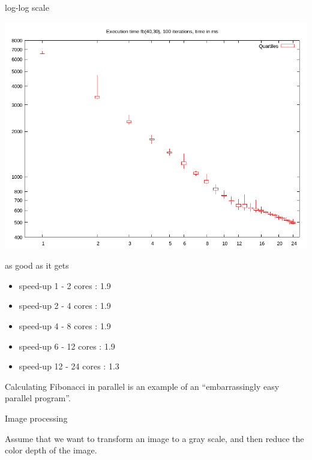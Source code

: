\begin{frame}{log-log scale}
 
\includegraphics[width=0.6\linewidth]{logxy.png}

\end{frame}

\begin{frame}{as good as it gets}

\begin{itemize}
  \item speed-up 1 - 2 cores : 1.9 %
  \item speed-up 2 - 4 cores : 1.9 %
  \item speed-up 4 - 8 cores : 1.9 %
  \item speed-up 6 - 12 cores : 1.9 %
\pause
  \item speed-up 12 - 24 cores : 1.3 %
\end{itemize}

\pause\vspace{20pt}

Calculating Fibonacci in parallel is an example of an ``embarrassingly
easy parallel program''.

\end{frame}

\begin{frame}{Image processing}

Assume that we want to transform an image to a gray scale, and then
reduce the color depth of the image.
\end{frame}


